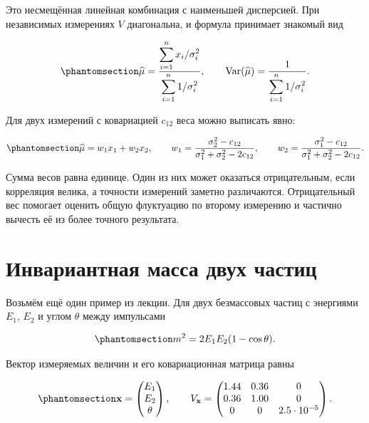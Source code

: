 \documentclass[
  russian,
  11pt,
  a4paper,
  open=any]{scrbook}
\begin{document}
Это несмещённая линейная комбинация с наименьшей дисперсией. При
независимых измерениях \(V\) диагональна, и формула принимает знакомый
вид

\begin{equation}\protect\phantomsection\label{eq-ch7-independent-weighted-mean}{
\widehat\mu=
\frac{\displaystyle\sum_{i=1}^{n}x_i/\sigma_i^2}
{\displaystyle\sum_{i=1}^{n}1/\sigma_i^2},
\qquad
\operatorname{Var}(\widehat\mu)=
\frac{1}{\displaystyle\sum_{i=1}^{n}1/\sigma_i^2}.
}\end{equation}

Для двух измерений с ковариацией \(c_{12}\) веса можно выписать явно:

\begin{equation}\protect\phantomsection\label{eq-ch7-two-measurement-weights}{
\widehat\mu=w_1x_1+w_2x_2,
\qquad
w_1=\frac{\sigma_2^2-c_{12}}
{\sigma_1^2+\sigma_2^2-2c_{12}},
\qquad
w_2=\frac{\sigma_1^2-c_{12}}
{\sigma_1^2+\sigma_2^2-2c_{12}}.
}\end{equation}

Сумма весов равна единице. Один из них может оказаться отрицательным,
если корреляция велика, а точности измерений заметно различаются.
Отрицательный вес помогает оценить общую флуктуацию по второму измерению
и частично вычесть её из более точного результата.

\section{Инвариантная масса двух
частиц}\label{ux438ux43dux432ux430ux440ux438ux430ux43dux442ux43dux430ux44f-ux43cux430ux441ux441ux430-ux434ux432ux443ux445-ux447ux430ux441ux442ux438ux446}

Возьмём ещё один пример из лекции. Для двух безмассовых частиц с
энергиями \(E_1\), \(E_2\) и углом \(\theta\) между импульсами

\begin{equation}\protect\phantomsection\label{eq-ch7-invariant-mass}{
m^2=2E_1E_2(1-\cos\theta).
}\end{equation}

Вектор измеряемых величин и его ковариационная матрица равны

\begin{equation}\protect\phantomsection\label{eq-ch7-invariant-mass-input-covariance}{
\mathbf x=
\begin{pmatrix}
E_1\\
E_2\\
\theta
\end{pmatrix},
\qquad
V_{\mathbf x}=
\begin{pmatrix}
1.44 & 0.36 & 0\\
0.36 & 1.00 & 0\\
0 & 0 & 2.5\cdot10^{-5}
\end{pmatrix}.
}\end{equation}
\end{document}
